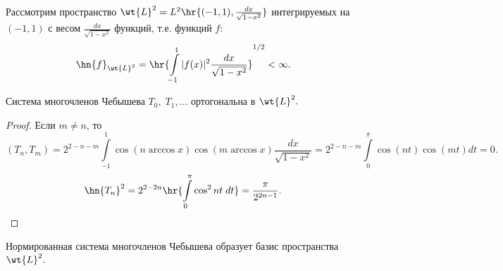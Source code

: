 \documentclass{article}
\begin{document}
Рассмотрим пространство
$\wt{L}^2=L^2\hr{(-1,1),\frac{dx}{\sqrt{1-x^2}}}$
интегрируемых на $(-1,1)$ с весом $\frac{dx}{\sqrt{1-x^2}}$
функций, т.е. функций $f$:
$$\hn{f}_{\wt{L}^2}=\hr{\int\limits_{-1}^1|f(x)|^2\frac{dx}{\sqrt{1-x^2}}}^{1/2}<\infty.$$
\begin{theorem}
Система многочленов Чебышева $T_0,\;T_1,\dots$ ортогональна в
$\wt{L}^2.$
\end{theorem}
\begin{proof}
  Если $m\neq n$, то
  $$(T_n,T_m)=2^{2-n-m}\int\limits_{-1}^1\cos(n\arccos
  x)\cos(m\arccos
  x)\frac{dx}{\sqrt{1-x^2}}=2^{2-n-m}\int\limits_0^{\pi}\cos(nt)\cos(mt)dt=0.$$
  $$\hn{T_n}^2=2^{2-2n}\hr{\int\limits_0^{\pi}\cos^2nt\;dt}=\frac{\pi}{2^{2n-1}}.$$
\end{proof}
\begin{theorem}
Нормированная система многочленов Чебышева образует базис
пространства $\wt{L}^2.$
\end{theorem}
\end{document}
